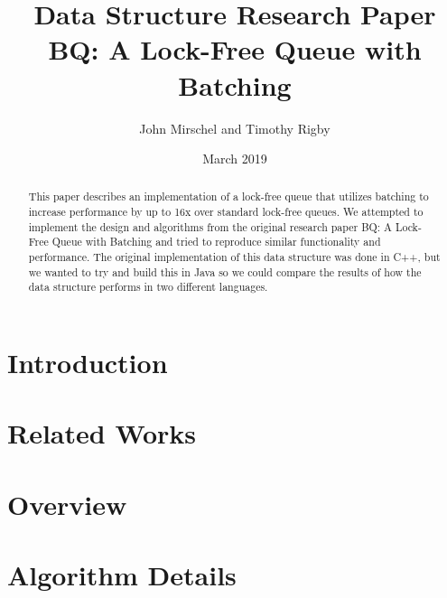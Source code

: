 \documentclass[12pt]{article}
\title{Data Structure Research Paper \\
    \large BQ: A Lock-Free Queue with Batching
}
\author{John Mirschel and Timothy Rigby}
\date{March 2019}
\begin{document}
\maketitle


\begin{abstract}
This paper describes an implementation of a lock-free queue that utilizes batching to increase performance by up to 16x over standard lock-free queues. We attempted to implement the design and algorithms from the original research paper BQ: A Lock-Free Queue with Batching  and tried to reproduce similar functionality and performance. The original implementation of this data structure was done in C++, but we wanted to try and build this in Java so we could compare the results of how the data structure performs in two different languages. 
\end{abstract}


\section{Introduction}


\section{Related Works}


\section{Overview}


\section{Algorithm Details}


\newpage

\printbibliography
\end{document}
